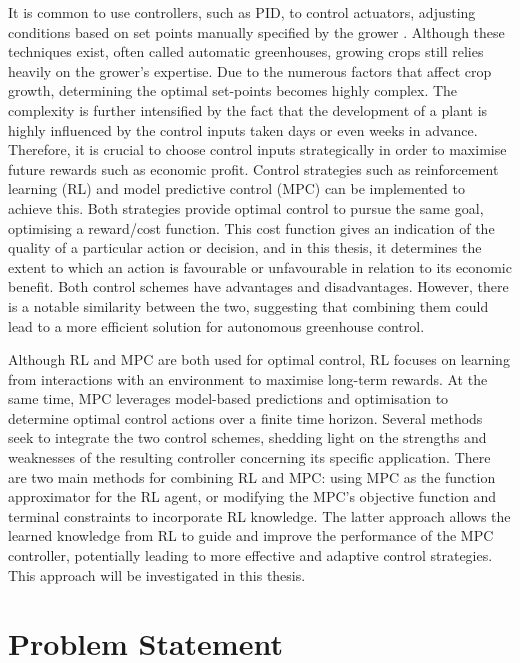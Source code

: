  It is common  to use controllers, such as PID, to control actuators, adjusting conditions based on set points manually specified by the grower \cite{zhangMethodologiesControlStrategies2020}. Although these techniques exist, often called automatic greenhouses, growing crops still relies heavily on the grower's expertise. Due to the numerous factors that affect crop growth, determining the optimal set-points becomes highly complex. The complexity is further intensified by the fact that the development of a plant is highly influenced by the control inputs taken days or even weeks in advance. Therefore, it is crucial to choose control inputs strategically in order to maximise future rewards such as economic profit. Control strategies such as reinforcement learning (RL) and model predictive control (MPC) can be implemented \cite{zhangMethodologiesControlStrategies2020} to achieve this. Both strategies provide optimal control to pursue the same goal, optimising a reward/cost function. This cost function gives an indication of the quality of a particular action or decision, and in this thesis, it determines the extent to which an action is favourable or unfavourable in relation to its economic benefit. Both control schemes have advantages and disadvantages. However, there is a notable similarity between the two, suggesting that combining them could lead to a more efficient solution for autonomous greenhouse control.

Although  RL and MPC are both used for optimal control, RL focuses on learning from interactions with an environment to maximise long-term rewards. At the same time, MPC leverages model-based predictions and optimisation to determine optimal control actions over a finite time horizon. Several methods seek to integrate the two control schemes, shedding light on the strengths and weaknesses of the resulting controller concerning its specific application. There are two main methods for combining RL and MPC: using MPC as the function approximator for the RL agent, or modifying the MPC's objective function and terminal constraints to incorporate RL knowledge. The latter approach allows the learned knowledge from RL to guide and improve the performance of the MPC controller, potentially leading to more effective and adaptive control strategies. This approach will be investigated in this thesis.

\section{Problem Statement}

